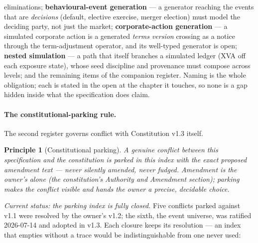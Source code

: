 \documentclass[11pt,a4paper]{article}
\newtheorem{principle}[definition]{Principle}
\begin{document}
eliminations; \textbf{behavioural-event generation} --- a generator reaching the events
that are \emph{decisions} (default, elective exercise, merger election) must model the
deciding party, not just the market; \textbf{corporate-action generation} --- a simulated
corporate action is a generated \emph{terms version} crossing as a notice through the
term-adjustment operator, and its well-typed generator is open; \textbf{nested simulation}
--- a path that itself branches a simulated ledger (XVA off each exposure state), whose
seed discipline and provenance must compose across levels; and the remaining items of the
companion register. Naming
is the whole obligation; each is stated in the open at the chapter it touches, so none is a
gap hidden inside what the specification does claim.

\paragraph{The constitutional-parking rule.} The second register governs conflict with
Constitution v1.3 itself.

\begin{principle}[Constitutional parking]
A genuine conflict between this specification and the constitution is parked in this index
with the exact proposed amendment text --- never silently amended, never fudged. Amendment
is the owner's alone (the constitution's \emph{Authority and Amendment} section); parking
makes the conflict visible and hands the owner a precise, decidable choice.
\end{principle}

\emph{Current status: the parking index is fully closed.} Five conflicts parked against
v1.1 were resolved by the owner's v1.2; the sixth, the event universe, was ratified
2026-07-14 and adopted in v1.3. Each closure keeps its resolution --- an index that empties
without a trace would be indistinguishable from one never used:
\end{document}
